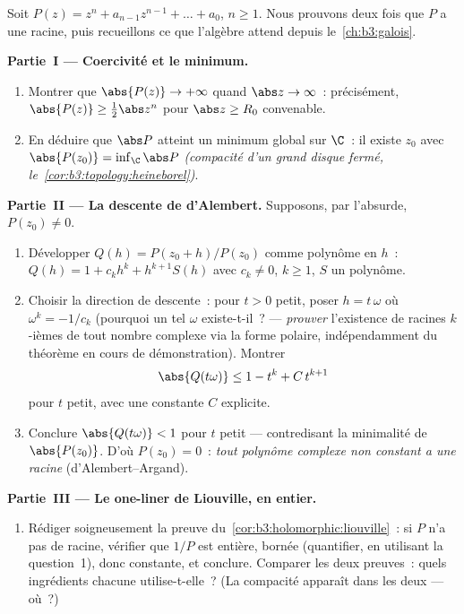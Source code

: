 \begin{problem}\label{pb:b3:holomorphic:1}
Soit $P(z) = z^n + a_{n-1}z^{n-1} + \dots + a_0$, $n \geq 1$.
Nous prouvons deux fois que $P$ a une racine, puis recueillons
ce que l'algèbre attend depuis le~\cref{ch:b3:galois}.

\medskip
\noindent\textbf{Partie~I --- Coercivité et le minimum.}
\begin{enumerate}
  \item Montrer que $\abs{P(z)} \to +\infty$ quand $\abs z \to
        \infty$~: précisément, $\abs{P(z)} \geq \frac12\abs
        z^n$ pour $\abs z \geq R_0$ convenable.
  \item En déduire que $\abs P$ atteint un minimum global sur
        $\C$~: il existe $z_0$ avec $\abs{P(z_0)} =
        \inf_\C\abs P$ \emph{(compacité d'un grand disque
        fermé, le~\cref{cor:b3:topology:heineborel})}.
\end{enumerate}

\medskip
\noindent\textbf{Partie~II --- La descente de d'Alembert.}
Supposons, par l'absurde, $P(z_0) \neq 0$.
\begin{enumerate}[resume]
  \item Développer $Q(h) = P(z_0 + h)/P(z_0)$ comme polynôme
        en $h$~: $Q(h) = 1 + c_kh^k + h^{k+1}S(h)$ avec $c_k
        \neq 0$, $k \geq 1$, $S$ un polynôme.
  \item Choisir la direction de descente~: pour $t > 0$ petit,
        poser $h = t\,\omega$ où $\omega^k = -1/c_k$
        (pourquoi un tel $\omega$ existe-t-il~? ---
        \emph{prouver} l'existence de racines $k$-ièmes de
        tout nombre complexe via la forme polaire,
        indépendamment du théorème en cours de démonstration).
        Montrer
        \[
        \abs{Q(t\omega)} \leq 1 - t^k + C\,t^{k+1}
        \]
        pour $t$ petit, avec une constante $C$ explicite.
  \item Conclure $\abs{Q(t\omega)} < 1$ pour $t$ petit ---
        contredisant la minimalité de $\abs{P(z_0)}$. D'où
        $P(z_0) = 0$~: \emph{tout polynôme complexe non
        constant a une racine} (d'Alembert--Argand).
\end{enumerate}

\medskip
\noindent\textbf{Partie~III --- Le one-liner de Liouville, en
entier.}
\begin{enumerate}[resume]
  \item Rédiger soigneusement la preuve
        du~\cref{cor:b3:holomorphic:liouville}~: si $P$ n'a
        pas de racine, vérifier que $1/P$ est entière,
        bornée (quantifier, en utilisant la question~1),
        donc constante, et conclure. Comparer les deux
        preuves~: quels ingrédients chacune utilise-t-elle~?
        (La compacité apparaît dans les deux --- où~?)
\end{enumerate}


\end{problem}
